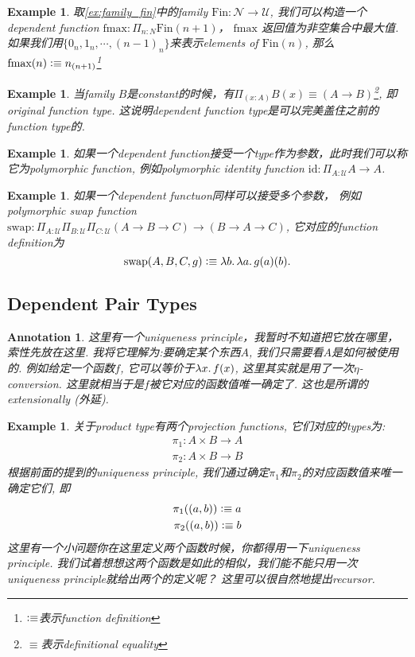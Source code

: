 \documentclass{article}
\newtheorem{example}[theorem]{Example}
\newtheorem{annotation}[theorem]{Annotation}
\newcommand{\lam}[2]{\ensuremath{\lambda #1\ldotp #2}} %
\newcommand{\defeqv}{\vcentcolon\equiv}
\begin{document}
\begin{example}
\rm 取\ref{ex:family_fin}中的family $\text{Fin}:\mathcal{N} \to \mathcal{U}$, 我们可以构造一个dependent function $\text{fmax}:\Pi_{n : N} \text{Fin}(n+1)$， $\text{fmax}$
返回值为非空集合中最大值. 如果我们用$\{0_{n}, 1_{n}, \cdots, (n-1)_n\}$来表示elements of $\text{Fin}(n)$, 那么$\text{fmax}(n) \defeqv n_{(n+1)}$\footnote{$\defeqv$表示function definition} 
\end{example}

\begin{example}
\rm 当family $B$是constant的时候，有$\Pi_{(x:A)} B(x) \equiv (A \to B)$\footnote{$\equiv$表示definitional equality}, 即original function type. 这说明dependent function type是可以完美盖住之前的function type的.
\end{example}

\begin{example}
\rm 如果一个dependent function接受一个type作为参数，此时我们可以称它为polymorphic function, 例如polymorphic identity function $\text{id}:\Pi_{A:\mathcal{U}} A \to A$.
\end{example}

\begin{example}
\rm 如果一个dependent functuon同样可以接受多个参数， 例如polymorphic swap function $\text{swap}: \Pi_{A:\mathcal{U}}\Pi_{B:\mathcal{U}}\Pi_{C:\mathcal{U}}(A \to B \to C) \to (B \to A \to C)$, 它对应的function definition为
\[
	\text{swap}(A,B,C,g) \defeqv \lam{b}{\lam{a}{g(a)(b)}}.
\]
\end{example}

\subsection{Dependent Pair Types}

\begin{annotation}
\rm 这里有一个uniqueness principle，我暂时不知道把它放在哪里，索性先放在这里. 我将它理解为:要确定某个东西$A$, 我们只需要看$A$是如何被使用的. 例如给定一个函数$f$, 它可以等价于$\lam{x}{f(x)}$, 这里其实就是用了一次$\eta$-conversion. 这里就相当于是$f$被它对应的函数值唯一确定了. 这也是所谓的extensionally (外延). %
\end{annotation}

\begin{example}
\rm 关于product type有两个projection functions, 它们对应的types为:
\[
	\begin{aligned}
	\pi_1: A \times B \to A \\
	\pi_2: A \times B \to B
	\end{aligned}
\]
根据前面的提到的uniqueness principle, 我们通过确定$\pi_1$和$\pi_2$的对应函数值来唯一确定它们, 即
\[
	\begin{aligned}
	\pi_1((a,b)) \defeqv a \\
	\pi_2((a,b)) \defeqv b 
	\end{aligned}
\]
这里有一个小问题你在这里定义两个函数时候，你都得用一下uniqueness principle. 我们试着想想这两个函数是如此的相似，我们能不能只用一次uniqueness principle就给出两个的定义呢？ 这里可以很自然地提出recursor.
\end{example}
\end{document}
